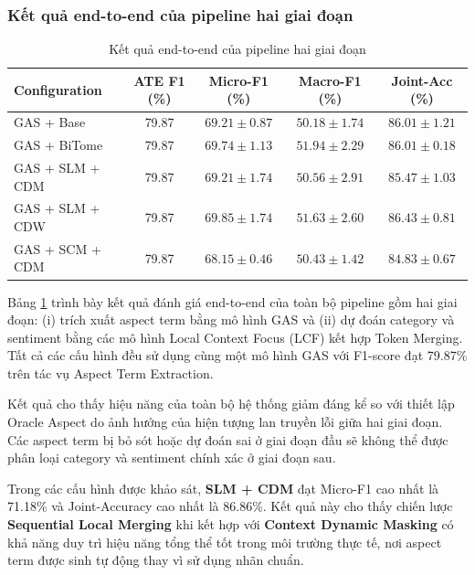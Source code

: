 \subsubsection*{Kết quả end-to-end của pipeline hai giai đoạn }
\begin{table}[H]
\centering
\small
\caption{Kết quả end-to-end của pipeline hai giai đoạn}
\label{tab:end2end_results}
\begin{tabular}{@{}lcccc@{}}
\toprule
\textbf{Configuration}
&
\textbf{ATE F1 (\%)}
&
\textbf{Micro-F1 (\%)}
&
\textbf{Macro-F1 (\%)}
&
\textbf{Joint-Acc (\%)} \\
\midrule

GAS + Base
& 79.87 & $69.21 \pm 0.87$ & $50.18 \pm 1.74$ & $86.01 \pm 1.21$ \\

GAS + BiTome
& 79.87 & $69.74 \pm 1.13$ & $\mathbf{51.94 \pm 2.29}$ & $86.01 \pm 0.18$ \\

GAS + SLM + CDM
& 79.87 & $69.21 \pm 1.74$ & $50.56 \pm 2.91$ & $85.47 \pm 1.03$ \\

GAS + SLM + CDW
& 79.87 & $\mathbf{69.85 \pm 1.74}$ & $51.63 \pm 2.60$ & $\mathbf{86.43 \pm 0.81}$ \\

GAS + SCM + CDM
& 79.87 & $68.15 \pm 0.46$ & $50.43 \pm 1.42$ & $84.83 \pm 0.67$ \\

\bottomrule
\end{tabular}
\end{table}
Bảng \ref{tab:end2end_results} trình bày kết quả đánh giá end-to-end của toàn bộ pipeline gồm hai giai đoạn: (i) trích xuất aspect term bằng mô hình GAS và (ii) dự đoán category và sentiment bằng các mô hình Local Context Focus (LCF) kết hợp Token Merging. Tất cả các cấu hình đều sử dụng cùng một mô hình GAS với F1-score đạt 79.87\% trên tác vụ Aspect Term Extraction.

Kết quả cho thấy hiệu năng của toàn bộ hệ thống giảm đáng kể so với thiết lập Oracle Aspect do ảnh hưởng của hiện tượng lan truyền lỗi giữa hai giai đoạn. Các aspect term bị bỏ sót hoặc dự đoán sai ở giai đoạn đầu sẽ không thể được phân loại category và sentiment chính xác ở giai đoạn sau.

Trong các cấu hình được khảo sát, \textbf{SLM + CDM} đạt Micro-F1 cao nhất là 71.18\% và Joint-Accuracy cao nhất là 86.86\%. Kết quả này cho thấy chiến lược \textbf{Sequential Local Merging} khi kết hợp với \textbf{Context Dynamic Masking} có khả năng duy trì hiệu năng tổng thể tốt trong môi trường thực tế, nơi aspect term được sinh tự động thay vì sử dụng nhãn chuẩn.

